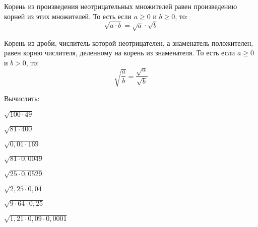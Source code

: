 \begin{class}[number=3]
	\begin{definit}
		Корень из произведения неотрицательных множителей равен произведению корней из этих множителей. То есть если \( a\ge0 \) и \( b\ge0 \), то: \[ \sqrt{a \cdot b}=\sqrt{a}\cdot\sqrt{b} \]
	\end{definit}
	\begin{definit}
		Корень из дроби,  числитель которой неотрицателен, а знаменатель положителен, равен корню числителя, деленному на корень из знаменателя. То есть если \( a\ge0 \) и \( b>0 \), то: \[ \sqrt{\dfrac{a}{b}}=\dfrac{\sqrt{a}}{\sqrt{b}} \]
	\end{definit}
	\begin{listofex}
		\item Вычислить:
		\begin{enumcols}[itemcolumns=3]
			\item \( \sqrt{100\cdot49} \)
			\item \( \sqrt{81\cdot400} \)
			\item \( \sqrt{0,01\cdot169} \)
			\item \( \sqrt{81\cdot0,0049} \)
			\item \( \sqrt{25\cdot0,0529} \)
			\item \( \sqrt{2,25\cdot0,04} \)
			\item \( \sqrt{9\cdot64\cdot0,25} \)
			\item \( \sqrt{1,21\cdot0,09\cdot0,0001} \)
			

\end{enumcols}
\end{listofex}
\end{class}
